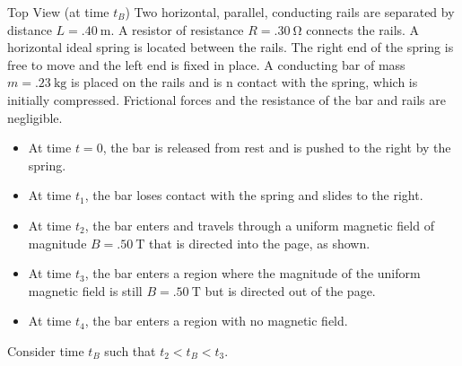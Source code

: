 \documentclass{../../../oss-apphys-exam}
\begin{document}
\begin{questions}
{    Top View (at time $t_B$)
  }
  \question Two horizontal, parallel, conducting rails are separated by
  distance $L=\SI{.40}\metre$. A resistor of resistance $R=\SI{.30}\ohm$
  connects the rails. A horizontal ideal spring is located between the rails.
  The right end of the spring is free to move and the left end is fixed in
  place. A conducting bar of mass $m=\SI{.23}{\kilo\gram}$ is placed on the
  rails and is n contact with the spring, which is initially compressed.
  Frictional forces and the resistance of the bar and rails are negligible.
  \begin{itemize}[itemsep=0pt]
  \item At time $t=0$, the bar is released from rest and is pushed to the right
    by the spring.
  \item At time $t_1$, the bar loses contact with the spring and slides to the
    right.
  \item At time $t_2$, the bar enters and travels through a uniform magnetic
    field of magnitude $B=\SI{.50}\tesla$ that is directed into the page, as
    shown.
  \item At time $t_3$, the bar enters a region where the magnitude of the
    uniform magnetic field is still $B=\SI{.50}\tesla$ but is directed out of
    the page.
  \item At time $t_4$, the bar enters a region with no magnetic field.
  \end{itemize}

  Consider time $t_B$ such that $t_2<t_B<t_3$.
\end{questions}
\end{document}

